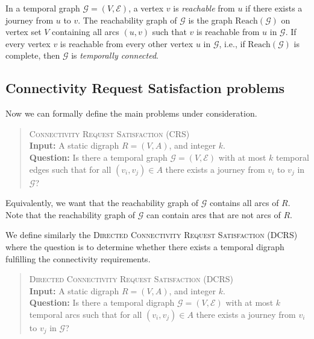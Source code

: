 \documentclass[11pt]{article}%
\newcommand{\G}{\mathcal{G}}
\begin{document}
    \begin{definition}[Reachability]
        In a temporal graph $\mathcal{G}=(V,\mathcal{E})$, a vertex $v$ is \textit{reachable} from $u$ if there exists a journey from $u$ to $v$. The reachability graph of $\mathcal{G}$ is the graph $\mathrm{Reach}(\mathcal{G})$ on vertex set $V$ containing all arcs $(u,v)$ such that $v$ is reachable from $u$ in $\mathcal{G}$. If every vertex $v$ is reachable from every other vertex $u$ in $\mathcal{G}$, i.e., if $\mathrm{Reach}(\mathcal{G})$ is complete, then $\mathcal{G}$ is \textit{temporally connected}. 
    \end{definition}




\subsection{Connectivity Request Satisfaction problems}

    Now we can formally define the main problems under consideration.
    \begin{quote}
        \textsc{Connectivity Request Satisfaction} (CRS)\\
        \textbf{Input:} A static digraph $R=(V,A)$, and integer $k$.\\
        \textbf{Question:} Is there a temporal graph $\mathcal{G}=(V,\mathcal{E})$ with at most $k$ temporal edges such that for all $(v_i,v_j)\in A$ there exists a journey from $v_i$ to $v_j$ in $\mathcal{G}$? 
    \end{quote}
    
    Equivalently, we want that the reachability graph of $\mathcal{G}$ contains all arcs of $R$. Note that the reachability graph of $\G$ can contain arcs that are not arcs of $R$.






    We define similarly the \textsc{Directed Connectivity Request Satisfaction} (DCRS) where the question is to determine whether there exists a temporal digraph fulfilling the connectivity requirements.

    \begin{quote}
        \textsc{Directed Connectivity Request Satisfaction} (DCRS)\\
        \textbf{Input:} A static digraph $R=(V,A)$, and integer $k$.\\
        \textbf{Question:} Is there a temporal digraph $\mathcal{G}=(V,\mathcal{E})$ with at most $k$ temporal arcs such that for all $(v_i,v_j)\in A$ there exists a journey from $v_i$ to $v_j$ in $\mathcal{G}$? 
    \end{quote}
    
\end{document}
